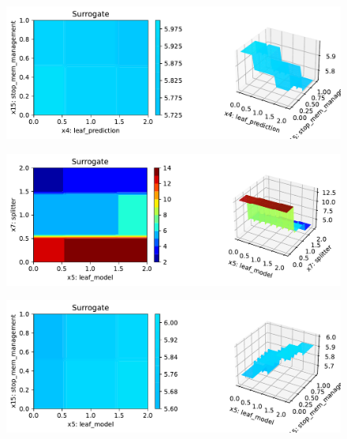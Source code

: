 \documentclass[
  letterpaper,
  DIV=11,
  numbers=noendperiod]{scrreprt}
\begin{document}
\begin{figure}[H]

{\centering \includegraphics{13_spot_hpt_river_files/figure-pdf/cell-44-output-4.pdf}

}

\end{figure}

\begin{figure}[H]

{\centering \includegraphics{13_spot_hpt_river_files/figure-pdf/cell-44-output-5.pdf}

}

\end{figure}

\begin{figure}[H]

{\centering \includegraphics{13_spot_hpt_river_files/figure-pdf/cell-44-output-6.pdf}

}

\end{figure}
\end{document}
